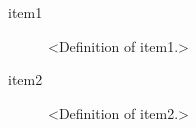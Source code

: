 %

%
% 
%
%
%

\begin{description}

\item [item1] \label{glos:item1} <Definition of item1.>

\item [item2] \label{glos:item2} <Definition of item2.>

\end{description}








